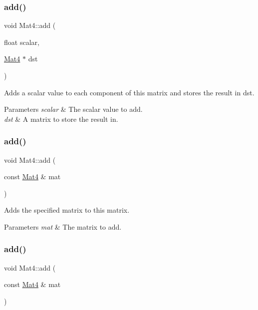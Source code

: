\subsubsection{\texorpdfstring{add()}{add()}\hspace{0.1cm}{\footnotesize\ttfamily [4/8]}}
{\footnotesize\ttfamily void Mat4\+::add (\begin{DoxyParamCaption}\item[{float}]{scalar,  }\item[{\hyperlink{classMat4}{Mat4} $\ast$}]{dst }\end{DoxyParamCaption})}

Adds a scalar value to each component of this matrix and stores the result in dst.


\begin{DoxyParams}{Parameters}
{\em scalar} & The scalar value to add. \\
\hline
{\em dst} & A matrix to store the result in. \\
\hline
\end{DoxyParams}
\mbox{\label{classMat4_a4eaf193ce281e0ea8db5cdffcf66bda3}} 
\subsubsection{\texorpdfstring{add()}{add()}\hspace{0.1cm}{\footnotesize\ttfamily [5/8]}}
{\footnotesize\ttfamily void Mat4\+::add (\begin{DoxyParamCaption}\item[{const \hyperlink{classMat4}{Mat4} \&}]{mat }\end{DoxyParamCaption})}

Adds the specified matrix to this matrix.


\begin{DoxyParams}{Parameters}
{\em mat} & The matrix to add. \\
\hline
\end{DoxyParams}
\mbox{\label{classMat4_a4eaf193ce281e0ea8db5cdffcf66bda3}} 
\subsubsection{\texorpdfstring{add()}{add()}\hspace{0.1cm}{\footnotesize\ttfamily [6/8]}}
{\footnotesize\ttfamily void Mat4\+::add (\begin{DoxyParamCaption}\item[{const \hyperlink{classMat4}{Mat4} \&}]{mat }\end{DoxyParamCaption})}

